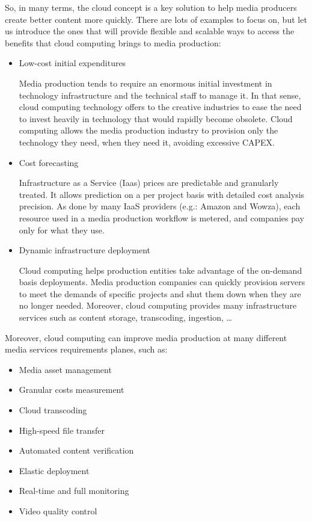 So, in many terms, the cloud concept is a key solution to help media producers create better content more quickly. There are lots of examples to focus on, but let us introduce the ones that will provide flexible and scalable ways to access the benefits that cloud computing brings to media production:

\begin{itemize}
\item Low-cost initial expenditures \hfill 

Media production tends to require an enormous initial investment in technology infrastructure and the technical staff to manage it. In that sense, cloud computing technology offers to the creative industries to ease the need to invest heavily in technology that would rapidly become obsolete. Cloud computing allows the media production industry to provision only the technology they need, when they need it, avoiding excessive CAPEX.

\item Cost forecasting\hfill 

Infrastructure as a Service (Iaas) prices are predictable and granularly treated. It allows prediction on a per project basis with detailed cost analysis precision. As done by many IaaS providers (e.g.: Amazon and Wowza), each resource used in a media production workflow is metered, and companies pay only for what they use.

\item Dynamic infrastructure deployment \hfill 

Cloud computing helps production entities take advantage of the on-demand basis deployments. Media production companies can quickly provision servers to meet the demands of specific projects and shut them down when they are no longer needed. Moreover, cloud computing provides many infrastructure services such as content storage, transcoding, ingestion, \ldots
\end{itemize}

Moreover, cloud computing can improve media production at many different media services requirements planes, such as:

\begin{itemize}
\item Media asset management
\item Granular costs measurement
\item Cloud transcoding
\item High-speed file transfer
\item Automated content verification
\item Elastic deployment
\item Real-time and full monitoring
\item Video quality control
\end{itemize}

